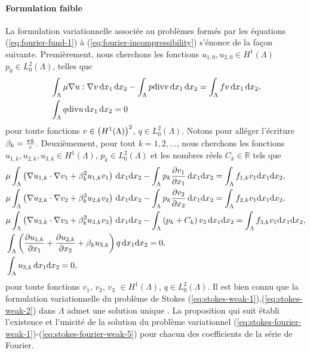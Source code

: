\paragraph{Formulation faible}\label{sec:stokes-fourier-weak}
La formulation variationnelle associée au problèmes formés par les
équations (\ref{eq:fourier-fund-1}) à
(\ref{eq:fourier-incompressibility}) s'énonce de la façon
suivante. Premièrement, nous cherchons les fonctions $u_{1,0},u_{2,0} \in
H^1(\Lambda)$ $p_0 \in L^2_0(\Lambda)$, telles
que
\begin{align}
&\int_\Lambda \mu \nabla u : \nabla v \,\mathrm dx_1\,\mathrm dx_2 -
\int_\Lambda p\mathrm{div} v \,\mathrm dx_1\,\mathrm dx_2 = \int_\Lambda f v
\,\mathrm dx_1\,\mathrm dx_2,\label{eq:stokes-weak-1}\\
&\int_\Lambda q\mathrm{div} u \,\mathrm dx_1\,\mathrm dx_2 = 0\label{eq:stokes-weak-2}
\end{align}
pour toute fonctions $v \in \left( H^1(\Lambda) \right)^2$, $q \in
L_0^2(\Lambda)$. Notons pour alléger l'écriture $\beta_k = \frac{\pi
  k}{\varepsilon}$. Deuxièmement, pour tout $k = 1, 2, \dots$, nous cherchons les
fonctions $u_{1,k},u_{2,k},u_{3,k} \in H^1(\Lambda)$, $p_k \in
L_0^2(\Lambda)$ et les nombres réels $C_k\in\mathbb R$ tels que
\begin{align}
  &\electrolyteviscosity \int_\Lambda \parent{\nabla u_{1,k}\cdot \nabla v_1 %
                           + \beta_k^2 u_{1,k}v_1}\,\mathrm dx_1\mathrm dx_2 %
  - \int_\Lambda p_k\frac{\partial v_1}{\partial x_1}\,\mathrm dx_1\mathrm dx_2 %
  = \int_\Lambda f_{1,k}v_1\mathrm dx_1\mathrm dx_2, \label{eq:stokes-fourier-weak-1}\\
  &\electrolyteviscosity \int_\Lambda \parent{\nabla u_{2,k}\cdot \nabla v_2 %
                           + \beta_k^2 u_{2,k}v_2}\,\mathrm dx_1\mathrm dx_2 %
  - \int_\Lambda p_k\frac{\partial v_2}{\partial x_2}\,\mathrm dx_1\mathrm dx_2 %
  = \int_\Lambda f_{2,k}v_1\mathrm dx_1\mathrm dx_2, \label{eq:stokes-fourier-weak-2}\\
  &\electrolyteviscosity \int_\Lambda \parent{\nabla u_{3,k}\cdot \nabla v_3 %
                           + \beta_k^2 u_{3,k}v_3}\,\mathrm dx_1\mathrm dx_2 %
  - \int_\Lambda \parent{p_k + C_k}v_3\,\mathrm dx_1\mathrm dx_2 %
  = \int_\Lambda f_{3,k}v_1\mathrm dx_1\mathrm dx_2, \label{eq:stokes-fourier-weak-3}\\
  &\int_\Lambda \parent{\frac{\partial u_{1,k}}{\partial x_1} %
                       + \frac{\partial u_{2,k}}{\partial x_2} + \beta_k u_{3,k}}q\,\mathrm dx_1\mathrm dx_2 %
  = 0,\label{eq:stokes-fourier-weak-4}\\
  &\int_\Lambda u_{3,k}\,\mathrm dx_1\mathrm dx_2 %
  = 0, \label{eq:stokes-fourier-weak-5}
\end{align}
pour toute fonctions $v_1$, $v_2$, $v_3$ $\in H^1(\Lambda)$, $q \in
L_0^2(\Lambda)$. Il est bien connu que la formulation variationnelle
du problème de Stokes
(\ref{eq:stokes-weak-1}),(\ref{eq:stokes-weak-2}) dans $\Lambda$ admet
une solution unique \cite{Temam1977}. La proposition qui suit établi l'existence et
l'unicité de la solution du problème variationnel
(\ref{eq:stokes-fourier-weak-1})-(\ref{eq:stokes-fourier-weak-5}) pour
chacun des coefficients de la série de Fourier.

